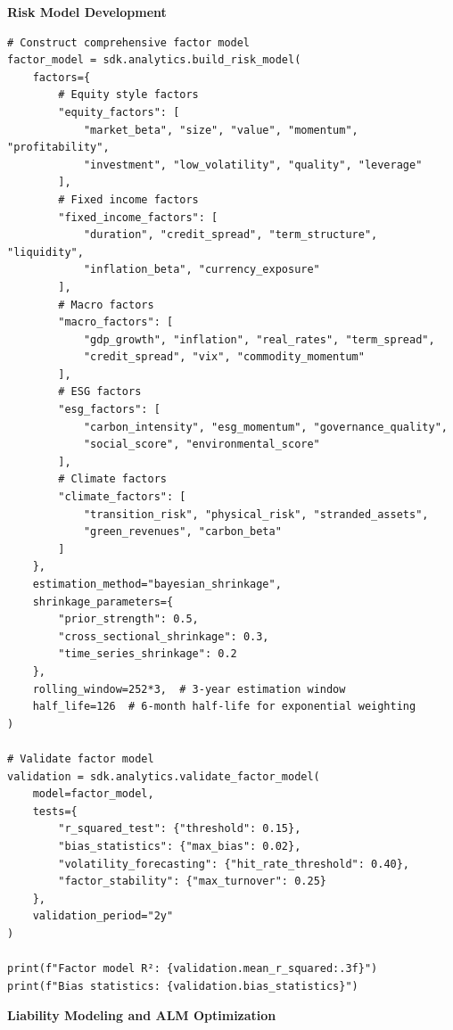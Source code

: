 \documentclass[12pt,a4paper]{article}
\theoremstyle{definition}
\theoremstyle{remark}
\begin{document}
\textbf{Risk Model Development}

\begin{lstlisting}[caption=Multi-Factor Risk Model Construction]
# Construct comprehensive factor model
factor_model = sdk.analytics.build_risk_model(
    factors={
        # Equity style factors
        "equity_factors": [
            "market_beta", "size", "value", "momentum", "profitability",
            "investment", "low_volatility", "quality", "leverage"
        ],
        # Fixed income factors
        "fixed_income_factors": [
            "duration", "credit_spread", "term_structure", "liquidity",
            "inflation_beta", "currency_exposure"
        ],
        # Macro factors
        "macro_factors": [
            "gdp_growth", "inflation", "real_rates", "term_spread",
            "credit_spread", "vix", "commodity_momentum"
        ],
        # ESG factors
        "esg_factors": [
            "carbon_intensity", "esg_momentum", "governance_quality",
            "social_score", "environmental_score"
        ],
        # Climate factors
        "climate_factors": [
            "transition_risk", "physical_risk", "stranded_assets",
            "green_revenues", "carbon_beta"
        ]
    },
    estimation_method="bayesian_shrinkage",
    shrinkage_parameters={
        "prior_strength": 0.5,
        "cross_sectional_shrinkage": 0.3,
        "time_series_shrinkage": 0.2
    },
    rolling_window=252*3,  # 3-year estimation window
    half_life=126  # 6-month half-life for exponential weighting
)

# Validate factor model
validation = sdk.analytics.validate_factor_model(
    model=factor_model,
    tests={
        "r_squared_test": {"threshold": 0.15},
        "bias_statistics": {"max_bias": 0.02},
        "volatility_forecasting": {"hit_rate_threshold": 0.40},
        "factor_stability": {"max_turnover": 0.25}
    },
    validation_period="2y"
)

print(f"Factor model R²: {validation.mean_r_squared:.3f}")
print(f"Bias statistics: {validation.bias_statistics}")
\end{lstlisting}

\textbf{Liability Modeling and ALM Optimization}
\end{document}
